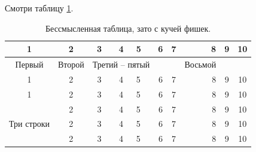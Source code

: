 \documentclass[a4paper, 12pt]{article}
\begin{document}
Смотри таблицу \ref{tab:mytab}.

\begin{table}[h] %
    \begin{center}
        \caption[Заголовок для списка таблиц]{Бессмысленная таблица, зато с кучей фишек.}\label{tab:mytab}
        \begin{tabular}{|c|c|c|c||l|c|c|r|c|c|}
            \hline
            1 & 2 & 3 & 4 & 5 & 6 & 7 & 8 & 9 & 10 \\ \hline
            Первый & Второй & \multicolumn{3}{|c|}{Третий -- пятый} &   &  & Восьмой &   &  \\  %
            \cline{1-7} \cline{9-10}
            1 & 2 & 3 & 4 & 5 & 6 & 7 & 8 & 9 & 10 \\ \hline \hline
            1 & 2 & 3 & 4 & 5 & 6 & 7 & 8 & 9 & 10 \\ \hline
            \multirow{3}{*}{Три строки}  & 2 & 3 & 4 & 5 & 6 & 7 & 8 & 9 & 10 \\ \cline{2-10}
            & 2 & 3 & 4 & 5 & 6 & 7 & 8 & 9 & 10 \\ \cline{2-10}
            & 2 & 3 & 4 & 5 & 6 & 7 & 8 & 9 & 10 \\ \hline
        \end{tabular}
    \end{center}
\end{table}
\end{document}
